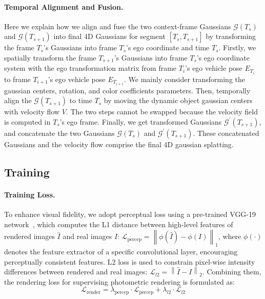 \paragraph{Temporal Alignment and Fusion.}
Here we explain how we align and fuse the two context-frame Gaussians $\mathcal{G}(T_s)$ and $\mathcal{G}(T_{s+1})$ into final 4D Gaussians for segment $[T_{s}, T_{s+1}]$ by transforming the frame $T_{s}$'s Gaussians into frame $T_s$'s ego coordinate and time $T_s$. Firstly, we spatially transform the frame $T_{s+1}$'s Gaussians into frame $T_{s}$'s ego coordinate system with the ego transformation matrix from frame $T_i$'s ego vehicle pose $E_{T_{i}}$ to frame $T_{i+1}$'s ego vehicle pose $E_{T_{i+1}}$. We mainly consider transforming the gaussian centers, rotation, and color coefficients parameters.  Then, temporally align the $\mathcal{G}(T_{s+1})$ to time $T_s$ by moving the dynamic object gaussian centers with velocity flow $V$. The two steps cannot be swapped because the velocity field is computed in $T_{s}$'s ego frame. Finally, we get transformed Gaussians $\mathcal{G}^{'}(T_{s+1})$, and concatenate the two Gaussians $\mathcal{G}(T_{s})$ and $\mathcal{G}^{'}(T_{s+1})$. These concatenated Gaussians and the velocity flow comprise the final 4D gaussian splatting.


\subsection{Training}
\label{sec:method-training}
\paragraph{Training Loss.}
To enhance visual fidelity, we adopt perceptual loss using a pre-trained VGG-19 network~\cite{simonyan2014very}, which computes the L1 distance between high-level features of rendered images $\hat{I}$ and real images $I$:
$\mathcal{L}_{\text{percep}} = \left\| \phi(\hat{I}) - \phi(I) \right\|_1$,
where $\phi(\cdot)$ denotes the feature extractor of a specific convolutional layer, encouraging perceptually consistent features. L2 loss is used to constrain pixel-wise intensity differences between rendered and real images: $\mathcal{L}_{l2} = \left\| \hat{I} - I \right\|_2$. Combining them, the rendering loss for supervising photometric rendering is formulated as:
\begin{equation}
\mathcal{L}_{\text{render}} = \lambda_{\text{percep}} \cdot \mathcal{L}_{\text{percep}} + \lambda_{l2} \cdot \mathcal{L}_{l2}
\end{equation}


